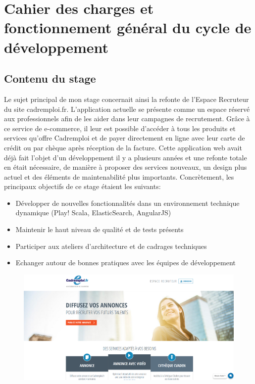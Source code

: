 \section{Cahier des charges et fonctionnement général du cycle de développement}
\subsection{Contenu du stage}
\label{sub:Contenu du stage}
Le sujet principal de mon stage concernait ainsi la refonte de l'Espace Recruteur du site cadremploi.fr.
L'application actuelle se présente comme un espace réservé aux professionnels afin de les aider dans leur campagnes de recrutement.
Grâce à ce service de e-commerce, il leur est possible d'accéder à tous les produits et services qu'offre Cadremploi et de payer directement en ligne avec leur carte de crédit ou par chèque après réception de la facture.
Cette application web avait déjà fait l'objet d'un développement il y a plusieurs années et une refonte totale en était nécessaire, de manière à proposer des services nouveaux, un design plus actuel et des éléments de maintenabilité plus importants.
Concrètement, les principaux objectifs de ce stage étaient les suivants:
\begin{itemize}
  \item{} Développer de nouvelles fonctionnalités dans un environnement technique dynamique (Play! Scala, ElasticSearch, AngularJS)
  \item{} Maintenir le haut niveau de qualité et de tests présents
  \item{} Participer aux ateliers d'architecture et de cadrages techniques
  \item{} Echanger autour de bonnes pratiques avec les équipes de développement
\end{itemize}
\begin{figure}[h]
  \begin{center}
    \hspace*{-1in}
    \includegraphics[width=1\textwidth]{Pictures/EspaceRecruteur.png}
  \end{center}
\end{figure}

